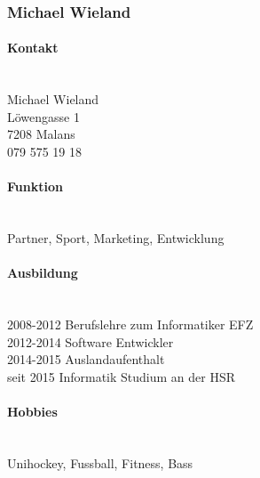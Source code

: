 \subsubsection{Michael Wieland}
\noindent\begin{minipage}{0.7\textwidth}
	\paragraph{Kontakt} \hfill \\
	Michael Wieland \\
	Löwengasse 1 \\
	7208 Malans \\
	079 575 19 18 \\
	
	\paragraph{Funktion} \hfill \\
	Partner, Sport, Marketing, Entwicklung \\
	
	\paragraph{Ausbildung} \hfill \\
	2008-2012 \hspace{2cm} Berufslehre zum Informatiker EFZ \\
	2012-2014 \hspace{2cm} Software Entwickler \\
	2014-2015 \hspace{2cm} Auslandaufenthalt \\
	seit 2015 \hspace{2.2cm} Informatik Studium an der HSR \\
	
	\paragraph{Hobbies} \hfill \\
	Unihockey, Fussball, Fitness, Bass
\end{minipage}
\hfill
